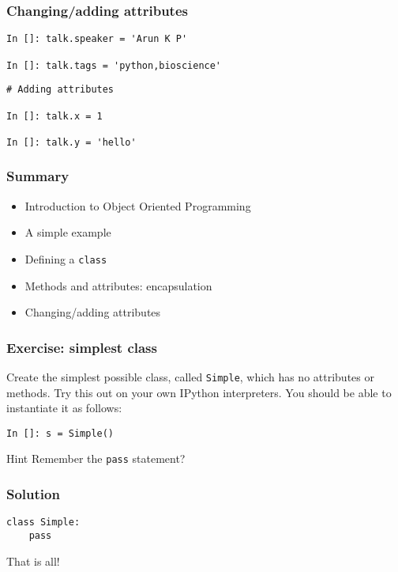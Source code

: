 \documentclass[14pt,compress,aspectratio=169]{beamer}
\begin{document}
\begin{frame}[fragile]
  \frametitle{Changing/adding attributes}
\begin{lstlisting}
In []: talk.speaker = 'Arun K P'

In []: talk.tags = 'python,bioscience'
\end{lstlisting}
\pause
\begin{lstlisting}
# Adding attributes

In []: talk.x = 1

In []: talk.y = 'hello'
\end{lstlisting}
\end{frame}

\begin{frame}
  \frametitle{Summary}
  \begin{itemize}
  \item Introduction to Object Oriented Programming
  \item A simple example
  \item Defining a \lstinline{class}
  \item Methods and attributes: encapsulation
  \item Changing/adding attributes
  \end{itemize}
\end{frame}

\begin{frame}[fragile]
  \frametitle{Exercise: simplest class}
  \begin{block}{}
    Create the simplest possible class, called \lstinline{Simple}, which has
    no attributes or methods.  Try this out on your own IPython interpreters.
    You should be able to instantiate it as follows:
  \end{block}
\begin{lstlisting}
In []: s = Simple()
\end{lstlisting}
  \pause
  \begin{block}{Hint}
    Remember the \lstinline{pass} statement?
  \end{block}
\end{frame}


\begin{frame}
  \frametitle{Solution}
\begin{lstlisting}
class Simple:
    pass
\end{lstlisting}
  \vspace*{0.5in}

  That is all!
\end{frame}
\end{document}
